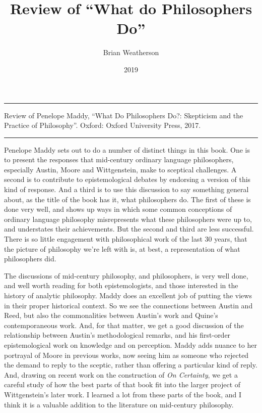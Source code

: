 \documentclass[
  10pt,
  letterpaper,
  DIV=11,
  numbers=noendperiod,
  twoside]{scrartcl}
\title{Review of ``What do Philosophers Do''}
\author{Brian Weatherson}
\date{2019}
\renewenvironment{abstract}
 {\vspace{-1.25cm}
 \quotation\small\noindent\rule{\linewidth}{.5pt}\par\smallskip
 \noindent }
 {\par\noindent\rule{\linewidth}{.5pt}\endquotation}
\begin{document}
\maketitle
\begin{abstract}
Review of Penelope Maddy, ``What Do Philosophers Do?: Skepticism and the
Practice of Philosophy''. Oxford: Oxford University Press, 2017.
\end{abstract}

Penelope Maddy sets out to do a number of distinct things in this book.
One is to present the responses that mid-century ordinary language
philosophers, especially Austin, Moore and Wittgenstein, make to
sceptical challenges. A second is to contribute to epistemological
debates by endorsing a version of this kind of response. And a third is
to use this discussion to say something general about, as the title of
the book has it, what philosophers do. The first of these is done very
well, and shows up ways in which some common conceptions of ordinary
language philosophy misrepresents what these philosophers were up to,
and understates their achievements. But the second and third are less
successful. There is so little engagement with philosophical work of the
last 30 years, that the picture of philosophy we're left with is, at
best, a representation of what philosophers did.

The discussions of mid-century philosophy, and philosophers, is very
well done, and well worth reading for both epistemologists, and those
interested in the history of analytic philosophy. Maddy does an
excellent job of putting the views in their proper historical context.
So we see the connections between Austin and Reed, but also the
commonalities between Austin's work and Quine's contemporaneous work.
And, for that matter, we get a good discussion of the relationship
between Austin's methodological remarks, and his first-order
epistemological work on knowledge and on perception. Maddy adds nuance
to her portrayal of Moore in previous works, now seeing him as someone
who rejected the demand to reply to the sceptic, rather than offering a
particular kind of reply. And, drawing on recent work on the
construction of \emph{On Certainty}, we get a careful study of how the
best parts of that book fit into the larger project of Wittgenstein's
later work. I learned a lot from these parts of the book, and I think it
is a valuable addition to the literature on mid-century philosophy.
\end{document}
